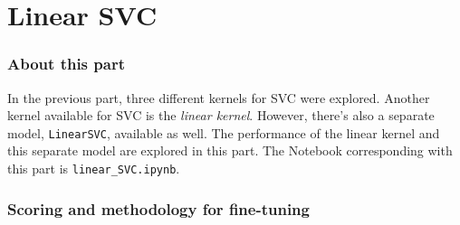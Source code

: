 \part{Linear SVC}
\label{part:linear_svc}


\section{About this part}
\label{section:LinSVC_about_part}

In the previous part, three different kernels for SVC were explored.
Another kernel available for SVC is the \textit{linear kernel}.
However, there's also a separate model, \texttt{LinearSVC}, available as well.
The performance of the linear kernel and this separate model are explored in this part.
The Notebook corresponding with this part is \texttt{linear\_SVC.ipynb}.


\section{Scoring and methodology for fine-tuning}
\label{section:LinSVC_methodology}

